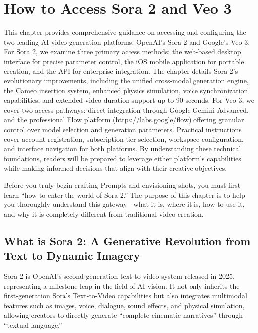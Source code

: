 \chapter{How to Access Sora 2 and Veo 3}
\label{ch:accessing-sora2}

\begin{chapterabstract}
This chapter provides comprehensive guidance on accessing and configuring the two leading AI video generation platforms: OpenAI's Sora 2 and Google's Veo 3. For Sora 2, we examine three primary access methods: the web-based desktop interface for precise parameter control, the iOS mobile application for portable creation, and the API for enterprise integration. The chapter details Sora 2's evolutionary improvements, including the unified cross-modal generation engine, the Cameo insertion system, enhanced physics simulation, voice synchronization capabilities, and extended video duration support up to 90 seconds. For Veo 3, we cover two access pathways: direct integration through Google Gemini Advanced, and the professional Flow platform (\url{https://labs.google/flow}) offering granular control over model selection and generation parameters. Practical instructions cover account registration, subscription tier selection, workspace configuration, and interface navigation for both platforms. By understanding these technical foundations, readers will be prepared to leverage either platform's capabilities while making informed decisions that align with their creative objectives.
\end{chapterabstract}

Before you truly begin crafting Prompts and envisioning shots, you must first learn ``how to enter the world of Sora 2.'' The purpose of this chapter is to help you thoroughly understand this gateway---what it is, where it is, how to use it, and why it is completely different from traditional video creation.

\section{What is Sora 2: A Generative Revolution from Text to Dynamic Imagery}

Sora 2 is OpenAI's second-generation text-to-video system released in 2025, representing a milestone leap in the field of AI vision. It not only inherits the first-generation Sora's Text-to-Video capabilities but also integrates multimodal features such as images, voice, dialogue, sound effects, and physical simulation, allowing creators to directly generate ``complete cinematic narratives'' through ``textual language.''

